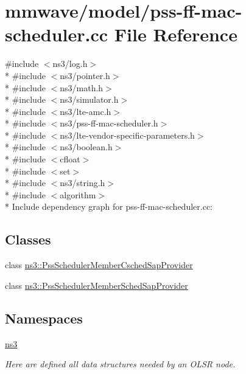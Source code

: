 \hypertarget{mmwave_2model_2pss-ff-mac-scheduler_8cc}{}\section{mmwave/model/pss-\/ff-\/mac-\/scheduler.cc File Reference}
\label{mmwave_2model_2pss-ff-mac-scheduler_8cc}
{\ttfamily \#include $<$ns3/log.\+h$>$}\\*
{\ttfamily \#include $<$ns3/pointer.\+h$>$}\\*
{\ttfamily \#include $<$ns3/math.\+h$>$}\\*
{\ttfamily \#include $<$ns3/simulator.\+h$>$}\\*
{\ttfamily \#include $<$ns3/lte-\/amc.\+h$>$}\\*
{\ttfamily \#include $<$ns3/pss-\/ff-\/mac-\/scheduler.\+h$>$}\\*
{\ttfamily \#include $<$ns3/lte-\/vendor-\/specific-\/parameters.\+h$>$}\\*
{\ttfamily \#include $<$ns3/boolean.\+h$>$}\\*
{\ttfamily \#include $<$cfloat$>$}\\*
{\ttfamily \#include $<$set$>$}\\*
{\ttfamily \#include $<$ns3/string.\+h$>$}\\*
{\ttfamily \#include $<$algorithm$>$}\\*
Include dependency graph for pss-\/ff-\/mac-\/scheduler.cc\+:
\subsection*{Classes}
\begin{DoxyCompactItemize}
\item 
class \hyperlink{classns3_1_1PssSchedulerMemberCschedSapProvider}{ns3\+::\+Pss\+Scheduler\+Member\+Csched\+Sap\+Provider}
\item 
class \hyperlink{classns3_1_1PssSchedulerMemberSchedSapProvider}{ns3\+::\+Pss\+Scheduler\+Member\+Sched\+Sap\+Provider}
\end{DoxyCompactItemize}
\subsection*{Namespaces}
\begin{DoxyCompactItemize}
\item 
 \hyperlink{namespacens3}{ns3}
\begin{DoxyCompactList}\small\item\em Here are defined all data structures needed by an O\+L\+SR node. \end{DoxyCompactList}\end{DoxyCompactItemize}
